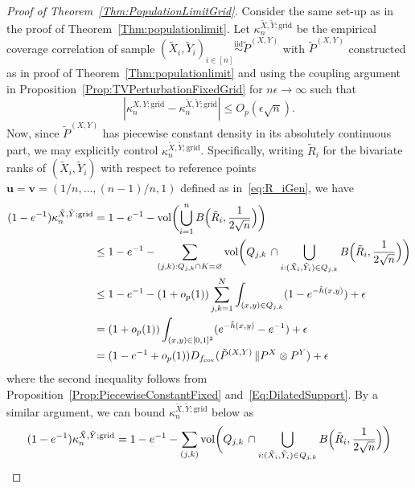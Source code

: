 \documentclass[11pt]{article}
\newcommand{\vol}{\mathrm{vol}}
\newcommand{\iid}{\stackrel{\mathrm{iid}}\sim}
\begin{document}
\begin{proof}[Proof of Theorem~\ref{Thm:PopulationLimitGrid}]
    Consider the same set-up as in the proof of Theorem~\ref{Thm:populationlimit}. Let $\kappa_n^{\tilde{X}, \tilde{Y};\mathrm{grid}}$ be the empirical coverage correlation of sample $(\tilde{X}_i, \tilde{Y}_i)_{i\in[n]}\iid \tilde{P}^{(X, Y)}$ with $\tilde{P}^{(X, Y)}$ constructed as in proof of Theorem~\ref{Thm:populationlimit} and using the coupling argument in Proposition~\ref{Prop:TVPerturbationFixedGrid} for $n\epsilon\to \infty$ such that     
    \begin{equation}
        \label{Eq:EmpiricalCoverageApproxFixed}
        |\kappa_n^{X,Y; \mathrm{grid}} - \kappa_n^{\tilde X,\tilde Y; \mathrm{grid}}|\leq O_p(\epsilon\sqrt{n}).
    \end{equation}
    Now, since $\tilde P^{(X,Y)}$ has piecewise constant density in its absolutely continuous part, we may explicitly control $\kappa_n^{\tilde X, \tilde Y; \mathrm{grid}}$. Specifically, writing $\tilde R_i$ for the bivariate ranks of $(\tilde X_i,\tilde Y_i)$ with respect to reference points $\boldsymbol{u} = \boldsymbol{v} = (1/n, \ldots, (n-1)/n, 1)$ defined as in~\eqref{eq:R_iGen}, we have 
    \begin{align*}
(1-e^{-1})\kappa_n^{\tilde X, \tilde Y;\mathrm{grid}} &= 1-e^{-1} -\vol\biggl(\bigcup_{i=1}^n B\Bigl(\tilde R_i, \frac{1}{2\sqrt{n}}\Bigr)\biggr)\nonumber \\
&\leq 1-e^{-1} - \sum_{(j,k):Q_{j,k}\cap K=\varnothing} \vol\biggl(Q_{j,k}\,\cap \bigcup_{i:(\tilde X_i,\tilde Y_i)\in Q_{j,k}} B\Bigl(\tilde R_i, \frac{1}{2\sqrt{n}}\Bigr)\biggr)\nonumber\\
&\leq 1-e^{-1} - (1+o_p(1))\sum_{j,k=1}^N \int_{(x,y)\in Q_{j,k}} (1-e^{-\tilde h(x,y)}) + \epsilon\nonumber\\
& = (1+o_p(1))\int_{(x,y)\in[0,1]^2} (e^{-\tilde h(x,y)}-e^{-1}) + \epsilon\nonumber\\
&= (1-e^{-1}+o_p(1))D_{f_{\mathrm{cov}}}(\tilde P^{(X,Y)}\,\| P^X\otimes P^Y)  + \epsilon  
\end{align*}
where the second inequality follows from Proposition~\ref{Prop:PiecewiseConstantFixed} and~\eqref{Eq:DilatedSupport}. By a similar argument, we can bound $\kappa_n^{\tilde X, \tilde Y; \mathrm{grid}}$ below as
\begin{align}
    &(1-e^{-1})\kappa_n^{\tilde X, \tilde Y; \mathrm{grid}} =  1-e^{-1} - \sum_{(j,k)} \vol\biggl(Q_{j,k}\,\cap \bigcup_{i:(\tilde X_i,\tilde Y_i)\in Q_{j,k}} B\Bigl(\tilde R_i, \frac{1}{2\sqrt{n}}\Bigr)\biggr) \nonumber \\

\end{align}
\end{proof}
\end{document}
